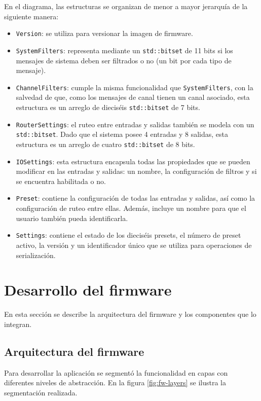 En el diagrama, las estructuras se organizan de menor a mayor jerarquía de la siguiente manera:
\begin{itemize}
	\item \texttt{Version}: se utiliza para versionar la imagen de firmware.
	\item \texttt{SystemFilters}: representa mediante un \texttt{std::bitset} \cite{cppreference:bitset} de 11 bits si los mensajes de sistema deben ser filtrados o no (un bit por cada tipo de mensaje).
	\item \texttt{ChannelFilters}: cumple la misma funcionalidad que \texttt{SystemFilters}, con la salvedad de que, como los mensajes de canal tienen un canal asociado, esta estructura es un arreglo de dieciséis \texttt{std::bitset} de 7 bits.
	\item \texttt{RouterSettings}: el ruteo entre entradas y salidas también se modela con un \texttt{std::bitset}. Dado que el sistema posee 4 entradas y 8 salidas, esta estructura es un arreglo de cuatro \texttt{std::bitset} de 8 bits.
	\item \texttt{IOSettings}: esta estructura encapsula todas las propiedades que se pueden modificar en las entradas y salidas: un nombre, la configuración de filtros y si se encuentra habilitada o no.
	\item \texttt{Preset}: contiene la configuración de todas las entradas y salidas, así como la configuración de ruteo entre ellas. Además, incluye un nombre para que el usuario también pueda identificarla.
	\item \texttt{Settings}: contiene el estado de los dieciséis presets, el número de preset activo, la versión y un identificador único que se utiliza para operaciones de serialización.
\end{itemize}



\section{Desarrollo del firmware} \label{desarrollo-firmware}

En esta sección se describe la arquitectura del firmware y los componentes que lo integran.

\subsection{Arquitectura del firmware} \label{arquitectura-firmware}
Para desarrollar la aplicación se segmentó la funcionalidad en capas con diferentes niveles de abstracción. En la figura \ref{fig:fw-layers} se ilustra la segmentación realizada.

